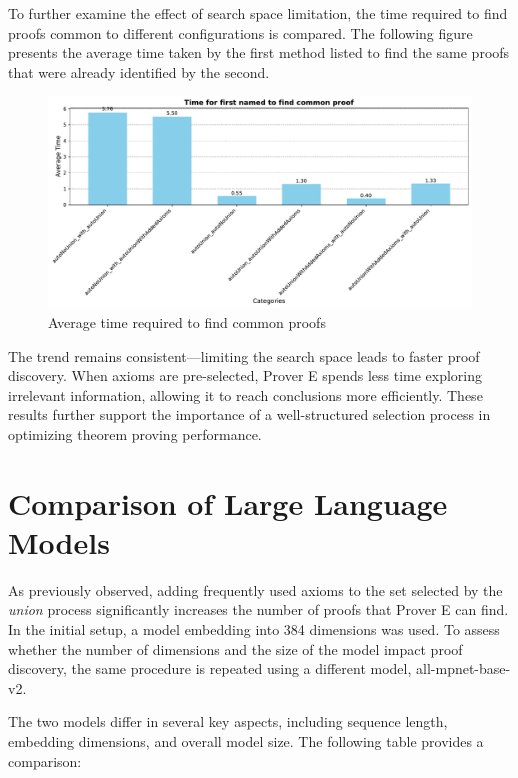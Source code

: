 \documentclass[english,version-2020-11]{uzl-thesis}
\begin{document}
To further examine the effect of search space limitation, the time required to find proofs common to different configurations is compared. The following figure presents the average time taken by the first method listed to find the same proofs that were already identified by the second.

\begin{figure}[h!]
    \centering
    \includegraphics[width=\textwidth]{time_to_find_common_proof.pdf}
    \caption{Average time required to find common proofs}
    \label{fig:time_different_mode}
\end{figure}        
\FloatBarrier

The trend remains consistent—limiting the search space leads to faster proof discovery. When axioms are pre-selected, Prover E spends less time exploring irrelevant information, allowing it to reach conclusions more efficiently. These results further support the importance of a well-structured selection process in optimizing theorem proving performance.


\section{Comparison of Large Language Models}

As previously observed, adding frequently used axioms to the set selected by the \textit{union} process significantly increases the number of proofs that Prover E can find. In the initial setup, a model embedding into 384 dimensions was used. To assess whether the number of dimensions and the size of the model impact proof discovery, the same procedure is repeated using a different model, all-mpnet-base-v2.

The two models differ in several key aspects, including sequence length, embedding dimensions, and overall model size. The following table provides a comparison:
\end{document}
